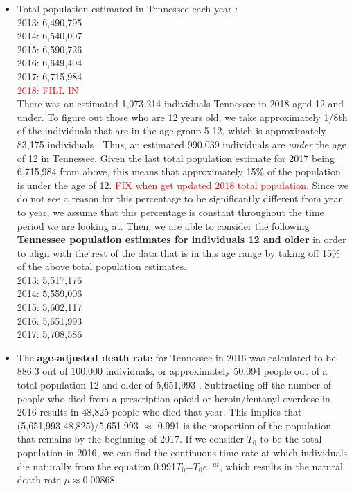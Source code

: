 \documentclass[12pt]{article}
\begin{document}
\begin{itemize}
\item Total population estimated in Tennessee each year \cite{USCensus}: \\
2013: 6,490,795 \\
2014: 6,540,007 \\
2015: 6,590,726 \\
2016: 6,649,404 \\
2017: 6,715,984 \\
\textcolor{red}{2018: FILL IN} \\

There was an estimated 1,073,214 individuals Tennessee in 2018 aged 12 and under. To figure out those who are 12 years old, we take approximately 1/8th of the individuals that are in the age group 5-12, which is approximately 83,175 individuals \cite{DOHHS}. Thus, an estimated 990,039 individuals are \emph{under} the age of 12 in Tennessee. Given the last total population estimate for 2017 being 6,715,984 from above, this means that approximately 15\% of the population is under the age of 12. \textcolor{red}{FIX when get updated 2018 total population}. Since we do not see a reason for this percentage to be significantly different from year to year, we assume that this percentage is constant throughout the time period we are looking at. Then, we are able to consider the following \textbf{Tennessee population estimates for individuals 12 and older} in order to align with the rest of the data that is in this age range by taking off 15\% of the above total population estimates.  \\
2013: 5,517,176 \\
2014: 5,559,006 \\
2015: 5,602,117 \\
2016: 5,651,993 \\
2017: 5,708,586 \\

\item The \textbf{age-adjusted death rate} for Tennessee in 2016 was calculated to be 886.3 out of 100,000 individuals, or approximately 50,094 people out of a total population 12 and older of 5,651,993 \cite{Kaiser}. Subtracting off the number of people who died from a prescription opioid or heroin/fentanyl overdose in 2016 results in 48,825 people who died that year. This implies that (5,651,993-48,825)/5,651,993 $\approx$ 0.991 is the proportion of the population that remains by the beginning of 2017. If we consider $T_0$ to be the total population in 2016, we can find the continuous-time rate at which individuals die naturally from the equation 0.991$T_0$=$T_0e^{-\mu t}$, which results in the natural death rate $\mu \approx 0.00868$.




\end{itemize}
\end{document}
